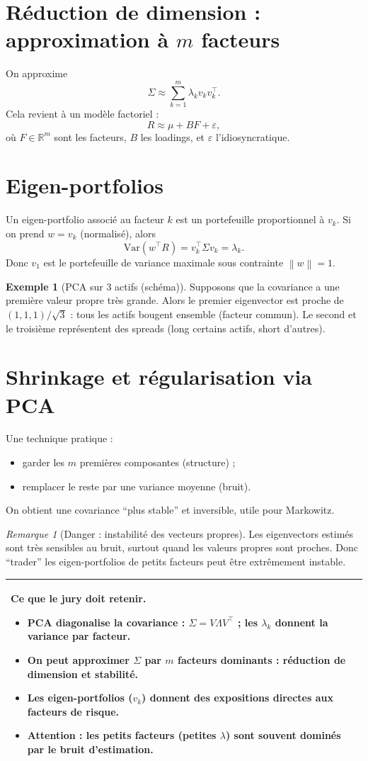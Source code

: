 \documentclass[11pt,a4paper]{report}
\newcommand{\Var}{\mathrm{Var}}
\newcommand{\R}{\mathbb{R}}
\newcommand{\1}{\mathbbm{1}}
\newcommand{\norm}[1]{\left\|#1\right\|}
\theoremstyle{definition}
\newtheorem{example}{Exemple}[chapter]
\theoremstyle{plain}
\theoremstyle{remark}
\newtheorem{remark}{Remarque}[chapter]
\newenvironment{jurybox}{%
  \begin{center}
  \setlength{\tabcolsep}{6pt}%
  \renewcommand{\arraystretch}{1.1}%
  \begin{tabular}{|p{0.94\textwidth}|}
  \hline
  \small\textbf{Ce que le jury doit retenir.}\par\medskip
}{%
  \\ \hline
  \end{tabular}
  \end{center}
}
\begin{document}
\section{Réduction de dimension : approximation à $m$ facteurs}
On approxime
\[
\Sigma \approx \sum_{k=1}^m \lambda_k v_k v_k^\top.
\]
Cela revient à un modèle factoriel :
\[
R \approx \mu + B F + \varepsilon,
\]
où $F\in\R^m$ sont les facteurs, $B$ les loadings, et $\varepsilon$ l'idiosyncratique.

\section{Eigen-portfolios}
Un eigen-portfolio associé au facteur $k$ est un portefeuille proportionnel à $v_k$.
Si on prend $w=v_k$ (normalisé), alors
\[
\Var(w^\top R)=v_k^\top \Sigma v_k = \lambda_k.
\]
Donc $v_1$ est le portefeuille de variance maximale sous contrainte $\norm{w}=1$.

\begin{example}[PCA sur 3 actifs (schéma)]
Supposons que la covariance a une première valeur propre très grande.
Alors le premier eigenvector est proche de $(1,1,1)/\sqrt{3}$ :
tous les actifs bougent ensemble (facteur commun).
Le second et le troisième représentent des spreads (long certains actifs, short d'autres).
\end{example}

\section{Shrinkage et régularisation via PCA}
Une technique pratique :
\begin{itemize}
  \item garder les $m$ premières composantes (structure) ;
  \item remplacer le reste par une variance moyenne (bruit).
\end{itemize}
On obtient une covariance ``plus stable'' et inversible, utile pour Markowitz.

\begin{remark}[Danger : instabilité des vecteurs propres]
Les eigenvectors estimés sont très sensibles au bruit,
surtout quand les valeurs propres sont proches.
Donc ``trader'' les eigen-portfolios de petits facteurs peut être extrêmement instable.
\end{remark}

\begin{jurybox}
\begin{itemize}
\item PCA diagonalise la covariance : $\Sigma=V\Lambda V^\top$ ; les $\lambda_k$ donnent la variance par facteur.
\item On peut approximer $\Sigma$ par $m$ facteurs dominants : réduction de dimension et stabilité.
\item Les eigen-portfolios ($v_k$) donnent des expositions directes aux facteurs de risque.
\item Attention : les petits facteurs (petites $\lambda$) sont souvent dominés par le bruit d'estimation.
\end{itemize}
\end{jurybox}
\end{document}
